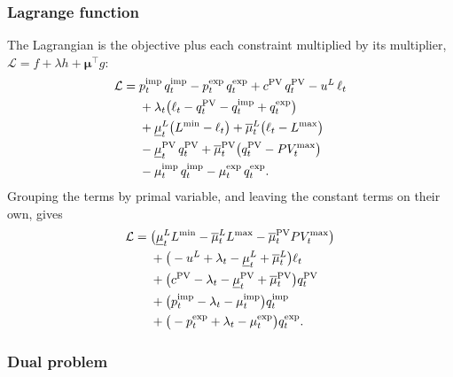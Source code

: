 \subsubsection{Lagrange function}
The Lagrangian is the objective plus each
constraint multiplied by its multiplier, $\mathcal{L} = f + \lambda h + \boldsymbol{\mu}^\top
g$:
\begin{align}
    \mathcal{L} = \;
    & \pimp \, \qimp - \pexp \, \qexp + \cpv \, \pvprod - \uL \, \load \nonumber \\
    & + \lbal \big( \load - \pvprod - \qimp + \qexp \big) \nonumber \\
    & + \muLlo \big( \Lmin - \load \big) + \muLup \big( \load - \Lmax \big) \nonumber \\
    & - \muPVlo \, \pvprod + \muPVup \big( \pvprod - \PVmax \big) \nonumber \\
    & - \muimp \, \qimp - \muexp \, \qexp .
    \label{eq:lagrangian}
\end{align}
Grouping the terms by primal variable, and leaving the constant terms on their own, gives
\begin{align}
    \mathcal{L} = \;
    & \big( \muLlo \Lmin - \muLup \Lmax - \muPVup \PVmax \big) \nonumber \\
    & + \big( -\uL + \lbal - \muLlo + \muLup \big) \load \nonumber \\
    & + \big( \cpv - \lbal - \muPVlo + \muPVup \big) \pvprod \nonumber \\
    & + \big( \pimp - \lbal - \muimp \big) \qimp \nonumber \\
    & + \big( -\pexp + \lbal - \muexp \big) \qexp .
    \label{eq:lagrangian_grouped}
\end{align}

\subsubsection{Dual problem}

